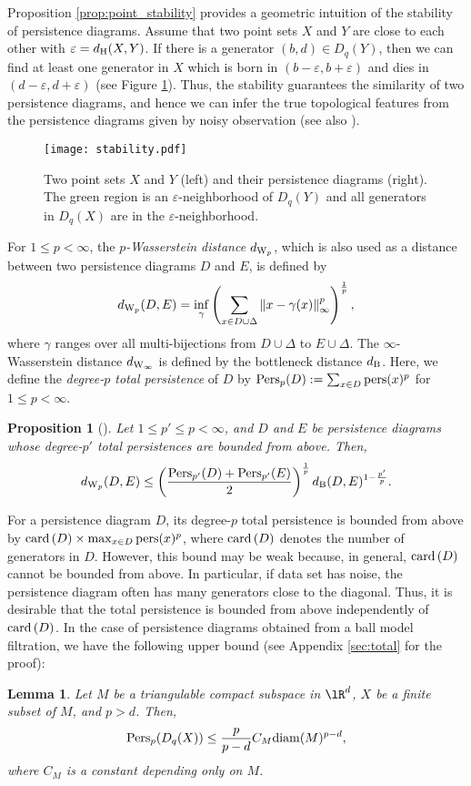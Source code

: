 \documentclass{article}
\newtheorem{lem}[thm]{Lemma}
\newtheorem{prop}[thm]{Proposition}
\newcommand{\DD}{{\Delta}}
\newcommand{\ee}{{\varepsilon}}
\newcommand{\Pers}{{\rm Pers}}
\newcommand{\pers}{{\rm pers}}
\newcommand{\diam}{{\rm diam}}
\providecommand{\norm}[1]{\left\lVert#1\right\rVert}
\providecommand{\pare}[1]{\left( #1 \right)}
\providecommand{\card}[1]{{\rm card}\pare{#1}}
\begin{document}
Proposition \ref{prop:point_stability} provides a geometric intuition of the stability of persistence diagrams.
Assume that two point sets $X$ and $Y$ are close to each other with $\ee=d_{{\rm H}}(X,Y)$. If there is a generator $(b,d) \in D_{q}(Y)$, then we can find at least one generator in $X$ which is born in $(b-\ee,b+\ee)$ and dies in $(d-\ee,d+\ee)$ (see Figure \ref{fig:stability}).
Thus, the stability guarantees the similarity of two persistence diagrams, and hence we can infer the true topological features from the persistence diagrams given by noisy observation (see also \cite{FLRWBS14}).
\begin{figure}[htbp]
\begin{center}
\texttt{[image: stability.pdf]}
\vspace{-3mm}
\caption{Two point sets $X$ and $Y$ (left) and their persistence diagrams (right).
The green region is an $\ee$-neighborhood of $D_{q}(Y)$ and all generators in $D_{q}(X)$ are in the $\ee$-neighborhood.}
\label{fig:stability}
\end{center}
\end{figure}

For $1 \leq p < \infty$, the {\em $p$-Wasserstein distance} $d_{{\rm W}_{p}}$, which is also used as a distance between two persistence diagrams $D$ and $E$, is defined by
\[
d_{ {\rm W}_{p}}(D,E)=\inf_{\gamma}\pare{\sum_{x \in D \cup \DD} \norm{x-\gamma(x)}^{p}_{\infty}}^{\frac{1}{p}},
\]
where $\gamma$ ranges over all multi-bijections from $D \cup \DD$ to $E \cup \DD$.
The $\infty$-Wasserstein distance $d_{{\rm W}_{\infty}}$ is defined by the bottleneck distance $d_{{\rm B}}$. Here, we define the {\em degree-$p$ total persistence} of $D$ by $\Pers_{p}(D):=\sum_{x \in D} \pers(x)^{p}$ for $1 \leq p < \infty$.

\begin{prop}[\cite{CEHM10}]
\label{prop:wasserstein_stability}
Let $1 \leq p' \leq p < \infty$, and $D$ and $E$ be persistence diagrams whose degree-$p'$ total persistences are bounded from above.
Then, 
\[
d_{ {\rm W}_{p}}(D, E) \leq \pare{\frac{\Pers_{p'}(D)+\Pers_{p'}(E)}{2}}^{\frac{1}{p}} d_{{\rm B}}(D,E)^{1-\frac{p'}{p}}.
\]
\end{prop}

For a persistence diagram $D$, its degree-$p$ total persistence is bounded from above by $\card{D} \times \max_{x \in D} \pers(x)^{p}$, where $\card{D}$ denotes the number of generators in $D$.
However, this bound may be weak because, in general, $\card{D}$ cannot be bounded from above.
In particular, if data set has noise, the persistence diagram often has many generators close to the diagonal.
Thus, it is desirable that the total persistence is bounded from above independently of $\card{D}$.
In the case of persistence diagrams obtained from a ball model filtration, we have the following upper bound (see Appendix \ref{sec:total} for the proof):
\begin{lem}
\label{lem:point_total}
Let $M$ be a triangulable compact subspace in $\lR^{d}$, $X$ be a finite subset of $M$, and $p>d$. 
Then, 
\[
\Pers_{p}(D_{q}(X)) \leq \frac{p}{p-d}C_{M}\diam(M)^{p-d},
\]
where $C_{M}$ is a constant depending only on $M$.
\end{lem}
\end{document}
